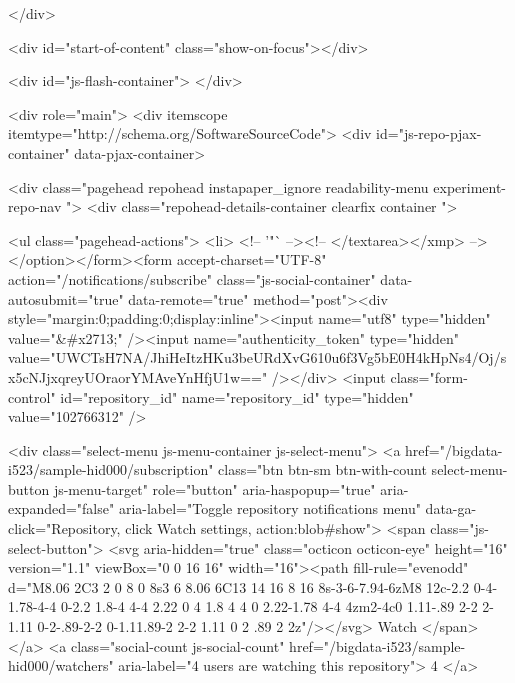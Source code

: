       

  </div>

  <div id="start-of-content" class="show-on-focus"></div>

    <div id="js-flash-container">
</div>



  <div role="main">
        <div itemscope itemtype="http://schema.org/SoftwareSourceCode">
    <div id="js-repo-pjax-container" data-pjax-container>
      



  



    <div class="pagehead repohead instapaper_ignore readability-menu experiment-repo-nav ">
      <div class="repohead-details-container clearfix container ">

        <ul class="pagehead-actions">
  <li>
        <!-- '"` --><!-- </textarea></xmp> --></option></form><form accept-charset="UTF-8" action="/notifications/subscribe" class="js-social-container" data-autosubmit="true" data-remote="true" method="post"><div style="margin:0;padding:0;display:inline"><input name="utf8" type="hidden" value="&#x2713;" /><input name="authenticity_token" type="hidden" value="UWCTsH7NA/JhiHeItzHKu3beURdXvG610u6f3Vg5bE0H4kHpNs4/Oj/sx5cNJjxqreyUOraorYMAveYnHfjU1w==" /></div>      <input class="form-control" id="repository_id" name="repository_id" type="hidden" value="102766312" />

        <div class="select-menu js-menu-container js-select-menu">
          <a href="/bigdata-i523/sample-hid000/subscription"
            class="btn btn-sm btn-with-count select-menu-button js-menu-target"
            role="button"
            aria-haspopup="true"
            aria-expanded="false"
            aria-label="Toggle repository notifications menu"
            data-ga-click="Repository, click Watch settings, action:blob#show">
            <span class="js-select-button">
                <svg aria-hidden="true" class="octicon octicon-eye" height="16" version="1.1" viewBox="0 0 16 16" width="16"><path fill-rule="evenodd" d="M8.06 2C3 2 0 8 0 8s3 6 8.06 6C13 14 16 8 16 8s-3-6-7.94-6zM8 12c-2.2 0-4-1.78-4-4 0-2.2 1.8-4 4-4 2.22 0 4 1.8 4 4 0 2.22-1.78 4-4 4zm2-4c0 1.11-.89 2-2 2-1.11 0-2-.89-2-2 0-1.11.89-2 2-2 1.11 0 2 .89 2 2z"/></svg>
                Watch
            </span>
          </a>
            <a class="social-count js-social-count"
              href="/bigdata-i523/sample-hid000/watchers"
              aria-label="4 users are watching this repository">
              4
            </a>


